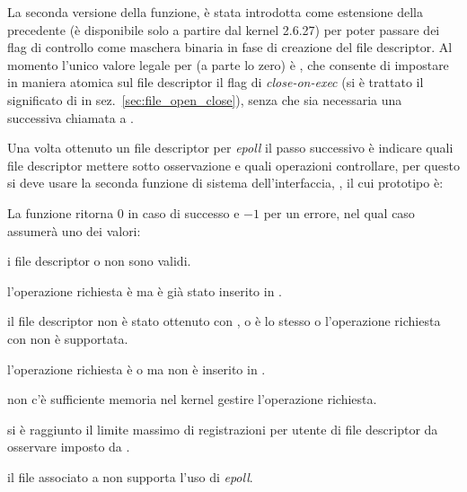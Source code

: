La seconda versione della funzione,  è stata introdotta
come estensione della precedente (è disponibile solo a partire dal kernel
2.6.27) per poter passare dei flag di controllo come maschera binaria in fase
di creazione del file descriptor. Al momento l'unico valore legale
per  (a parte lo zero) è , che consente di
impostare in maniera atomica sul file descriptor il flag di
\textit{close-on-exec} (si è trattato il significato di  in
sez.~\ref{sec:file_open_close}), senza che sia necessaria una successiva
chiamata a .

Una volta ottenuto un file descriptor per \textit{epoll} il passo successivo è
indicare quali file descriptor mettere sotto osservazione e quali operazioni
controllare, per questo si deve usare la seconda funzione di sistema
dell'interfaccia, , il cui prototipo è:

\begin{funcproto}{

}

{La funzione ritorna $0$ in caso di successo e $-1$ per un errore, nel qual
  caso  assumerà uno dei valori:
  \begin{errlist}
  \item[\errcode{EBADF}] i file descriptor  o  non sono
    validi.
  \item[\errcode{EEXIST}] l'operazione richiesta è  ma
     è già stato inserito in .
  \item[\errcode{EINVAL}] il file descriptor  non è stato ottenuto
    con , o  è lo stesso  o
    l'operazione richiesta con  non è supportata.
  \item[\errcode{ENOENT}] l'operazione richiesta è  o
     ma  non è inserito in .
  \item[\errcode{ENOMEM}] non c'è sufficiente memoria nel kernel gestire
    l'operazione richiesta.
  \item[\errcode{ENOSPC}] si è raggiunto il limite massimo di registrazioni
    per utente di file descriptor da osservare imposto da
    .
  \item[\errcode{EPERM}] il file associato a  non supporta l'uso di
    \textit{epoll}.
  \end{errlist}
  }  
\end{funcproto}

